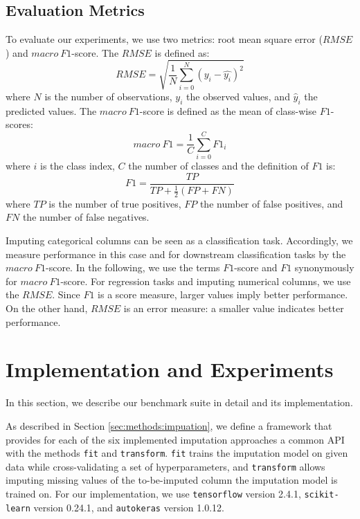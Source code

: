 \documentclass[utf8]{frontiersSCNS} %
\newcommand{\code}[1]{\texttt{#1}}
\begin{document}
\subsection{Evaluation Metrics}
%
To evaluate our experiments, we use two metrics: root mean square error ($RMSE$) and $macro\ F1$-score.
%
The $RMSE$ is defined as:
%
\begin{equation}
	RMSE = \sqrt{\frac{1}{N} \sum_{i = 0}^{N} (y_i - \hat{y_i})^2}
	\label{eq:RMSE}
\end{equation}
%
where $N$ is the number of observations, $y_i$ the observed values, and $\hat{y}_{i}$ the predicted values.
The $macro\ F1$-score is defined as the mean of class-wise $F1$-scores:
%
\begin{equation}
	macro\ F1 = \frac{1}{C}\sum_{i = 0}^{C} F1_i
	\label{eq:F1}
\end{equation}
%
where $i$ is the class index, $C$ the number of classes and the definition of $F1$ is:
%
\begin{equation}
	F1 = \frac{TP}{TP + \frac{1}{2}(FP + FN)}
\end{equation}
%
where $TP$ is the number of true positives, $FP$ the number of false positives, and $FN$ the number of false negatives.

Imputing categorical columns can be seen as a classification task. Accordingly, we measure performance in this case and for downstream classification tasks by the $macro\ F1$-score. In the following, we use the terms $F1$-score and $F1$ synonymously for $macro\ F1$-score. For regression tasks and imputing numerical columns, we use the $RMSE$. Since $F1$ is a score measure, larger values imply better performance. On the other hand, $RMSE$ is an error measure: a smaller value indicates better performance.


\section{Implementation and Experiments}
\label{sec:implementation}
%
In this section, we describe our benchmark suite in detail and its implementation.

As described in Section \ref{sec:methods:impuation}, we define a framework that provides for each of the six implemented imputation approaches a common API with the methods \code{fit} and \code{transform}. \code{fit} trains the imputation model on given data while cross-validating a set of hyperparameters, and \code{transform} allows imputing missing values of the to-be-imputed column the imputation model is trained on. For our implementation, we use \code{tensorflow} version 2.4.1, \code{scikit-learn} version 0.24.1, and \code{autokeras} version 1.0.12.
\end{document}
